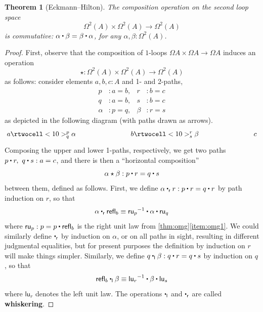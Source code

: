 \documentclass[10pt,a4paper]{article}
\providecommand{\index}[1]{}
\newcommand{\jdeq}{\equiv}      %
\newcommand{\define}[1]{\textbf{#1}}
\newcommand{\leftwhisker}{\mathbin{{\ct}_{\mathsf{l}}}}  %
\newcommand{\rightwhisker}{\mathbin{{\ct}_{\mathsf{r}}}} %
\newcommand{\hct}{\star}
\newcommand{\refl}[1]{\ensuremath{\mathsf{refl}_{#1}}\xspace}
\newcommand{\ct}{%
  \mathchoice{\mathbin{\raisebox{0.5ex}{$\displaystyle\centerdot$}}}%
             {\mathbin{\raisebox{0.5ex}{$\centerdot$}}}%
             {\mathbin{\raisebox{0.25ex}{$\scriptstyle\,\centerdot\,$}}}%
             {\mathbin{\raisebox{0.1ex}{$\scriptscriptstyle\,\centerdot\,$}}}
}
\newcommand{\opp}[1]{\mathord{{#1}^{-1}}}
\newtheorem{thm}{Theorem}[section]
\theoremstyle{definition}
\theoremstyle{remark}
\numberwithin{equation}{section}
\newcommand{\indexdef}[1]{\index{#1|defstyle}}   %
\begin{document}
\begin{thm}[Eckmann--Hilton]\label{thm:EckmannHilton}
  The composition operation on the second loop space
  \begin{equation*}
    \Omega^2(A)\times \Omega^2(A)\to \Omega^2(A)
  \end{equation*}
  is commutative: $\alpha\ct\beta = \beta\ct\alpha$, for any $\alpha, \beta:\Omega^2(A)$.
  \index{Eckmann--Hilton argument}%
\end{thm}

\begin{proof}
First, observe that the composition of $1$-loops $\Omega A\times \Omega A\to \Omega A$ induces an operation
\[
\star : \Omega^2(A)\times \Omega^2(A)\to \Omega^2(A)
\]
as follows: consider elements $a, b, c : A$ and 1- and 2-paths,
%
\begin{align*}
  p &: a = b,       &       r &: b = c \\
  q &: a = b,       &       s &: b = c \\
  \alpha &: p = q,  &   \beta &: r = s
\end{align*}
%
as depicted in the following diagram (with paths drawn as arrows).
\[
 \xymatrix@+5em{
   {a} \rtwocell<10>^p_q{\alpha}
   &
   {b} \rtwocell<10>^r_s{\beta}
   &
   {c}
 }
\]
Composing the upper and lower 1-paths, respectively, we get two paths $p\ct r,\ q\ct s : a = c$, and there is then a ``horizontal composition''
%
\begin{equation*}
  \alpha\hct\beta : p\ct r = q\ct s
\end{equation*}
%
between them, defined as follows.
First, we define $\alpha \rightwhisker r : p\ct r = q\ct r$ by path induction on $r$, so that
\[ \alpha \rightwhisker \refl{b} \jdeq \opp{\mathsf{ru}_p} \ct \alpha \ct \mathsf{ru}_q \]
where $\mathsf{ru}_p : p = p \ct \refl{b}$ is the right unit law from \cref{thm:omg}\ref{item:omg1}.
We could similarly define $\rightwhisker$ by induction on $\alpha$, or on all paths in sight, resulting in different judgmental equalities, but for present purposes the definition by induction on $r$ will make things simpler.
Similarly, we define $q\leftwhisker \beta : q\ct r = q\ct s$ by induction on $q$, so that
\[ \refl{b} \leftwhisker \beta \jdeq \opp{\mathsf{lu}_r} \ct \beta \ct \mathsf{lu}_s \]
where $\mathsf{lu}_r$ denotes the left unit law.
The operations $\leftwhisker$ and $\rightwhisker$ are called \define{whiskering}\indexdef{whiskering}.

\end{proof}
\end{document}
